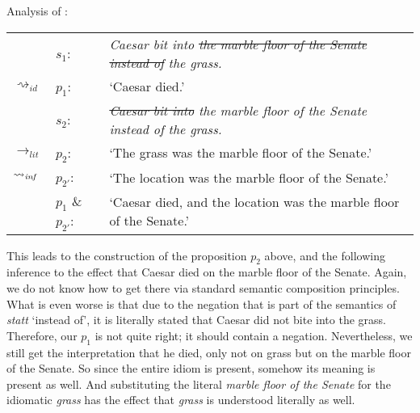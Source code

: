 \documentclass[output=paper]{langsci/langscibook}
\begin{document}
\ea \label{analysis marble floor} 
Analysis of :\smallskip\\
\begin{tabularx}{\linewidth}[t]{@{}llQ@{}}
& 	$s_{1}$: & \textit{Caesar bit into \sout{the marble floor of the Senate instead of} the grass.} \\
$\rightsquigarrow_{id}$				&	$p_{1}$: & `Caesar died.' \medskip\\
& 	$s_{2}$: & \textit{\sout{Caesar bit into} the marble floor of the Senate instead of the grass.} \\
$\rightarrow_{lit}$	&	$p_{2}$: & `The grass was the marble floor of the Senate.' \\
$\rightsquigarrow_{\text{\itshape inf}}$	&	$p_{2'}$: & `The location was the marble floor of the Senate.' \medskip\\
&	$p_{1}$ \& $p_{2'}$: & `Caesar died, and the location was the marble floor of the Senate.' \\
\end{tabularx}
\z

\noindent This leads to the construction of the proposition $p_{2}$ above, and the following inference to the effect that Caesar died on the marble floor of the Senate. Again, we do not know how to get there via standard semantic composition principles. What is even worse %
is that due to the negation that is part of the semantics of \textit{statt} `instead of', it is literally stated that Caesar did not bite into the grass. Therefore, our $p_{1}$ is not quite right; it should contain a negation. Nevertheless, we still get the interpretation that he died, only not on grass but on the marble floor of the Senate. So since the entire idiom is present, somehow its meaning is present as well. And substituting the literal \textit{marble floor of the Senate} for the idiomatic \textit{grass} has the effect that \textit{grass} is understood literally as well.
\end{document}
